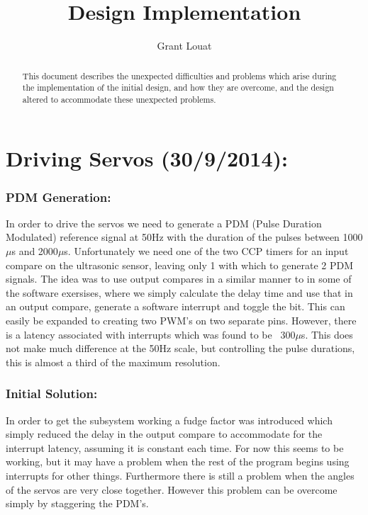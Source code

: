 \documentclass[]{article}
\title{Design Implementation}
\author{Grant Louat}
\begin{document}
\maketitle

\newpage
\begin{abstract}
This document describes the unexpected difficulties and problems which arise during the implementation of the initial design, and how they are overcome, and the design altered to accommodate these unexpected problems.
\end{abstract}

\newpage
\section{Driving Servos (30/9/2014):}
\subsubsection{PDM Generation:}
In order to drive the servos we need to generate a PDM (Pulse Duration Modulated) reference signal at 50Hz with the duration of the pulses between 1000$\mu$s and 2000$\mu$s. Unfortunately we need one of the two CCP timers for an input compare on the ultrasonic sensor, leaving only 1 with which to generate 2 PDM signals. \newline
The idea was to use output compares in a similar manner to in some of the software exersises, where we simply calculate the delay time and use that in an output compare, generate a software interrupt and toggle the bit. This can easily be expanded to creating two PWM's on two separate pins. However, there is a latency associated with interrupts which was found to be ~300$\mu$s. This does not make much difference at the 50Hz scale, but controlling the pulse durations, this is almost a third of the maximum resolution.

\subsubsection{Initial Solution:}
In order to get the subsystem working a fudge factor was introduced which simply reduced the delay in the output compare to accommodate for the interrupt latency, assuming it is constant each time. For now this seems to be working, but it may have a problem when the rest of the program begins using interrupts for other things. Furthermore there is still a problem when the angles of the servos are very close together. However this problem can be overcome simply by staggering the PDM's.
\end{document}
